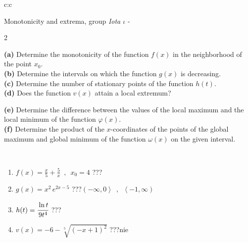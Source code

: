 \documentclass[10pt]{report}
\begin{document}
\begin{tabular}{c:c}
\begin{minipage}[c][104.5mm][t]{0.5\linewidth}
\begin{center}
\vspace{5mm}
{\huge Monotonicity and extrema, group \textit{Iota $\iota$} -}\\[5mm]
\begin{minipage}{0.95\linewidth}
\begin{center}
{\small \begin{multicols}{2} \raggedright
\textbf{(a)} Determine the monotonicity of the function \(f(x)\) in the neighborhood of the point \(x_0\). \\[1mm]
\textbf{(b)} Determine the intervals on which the function \(g(x)\) is decreasing. \\[1mm]
\textbf{(c)} Determine the number of stationary points of the function \(h(t)\). \\[1mm]
\textbf{(d)} Does the function \(v(x)\) attain a local extremum? \par \columnbreak
\textbf{(e)} Determine the difference between the values of the local maximum and the local minimum of the function \(\varphi(x)\). \\[1mm]
\textbf{(f)} Determine the product of the \(x\)-coordinates of the points of the global maximum and global minimum of the function \(\omega(x)\) on the given interval. \\[1mm]
\end{multicols}
}
\end{center}
\end{minipage}
\\[1mm]
\begin{minipage}{0.79\linewidth}
\begin{center}
\begin{varwidth}{\linewidth}
\setlength{\itemsep}{0pt}
\begin{enumerate}
\normalsize
\item $f(x)=\frac{x}{5}+\frac{5}{x} \enspace , \enspace x_0=4$\quad \dotfill\; ???\;\dotfill \quad {}
\item $g(x)=x^2\, e^{2x-5}$\quad \dotfill\; ???\;\dotfill \quad $\left(-\infty , 0\right\rangle\enspace , \enspace \left\langle-1 , \infty\right)$
\item $h(t)=\cfrac{\ln t}{9t^4}$\quad \dotfill\; ???\;\dotfill {}
\item $v(x)=-6-\sqrt[5]{(-x+1)^2}$\quad \dotfill\; ???\;\dotfill \quad $\text{nie}$

\end{enumerate}
\end{varwidth}
\end{center}
\end{minipage}
\end{center}
\end{minipage}
\end{tabular}
\end{document}
